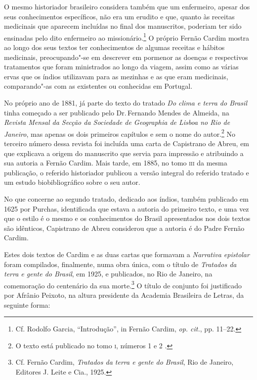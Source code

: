 O mesmo historiador brasileiro considera também que um enfermeiro,
apesar dos seus conhecimentos específicos, não era um erudito e que,
quanto às receitas medicinais que aparecem incluídas no final dos
manuscritos, poderiam ter sido ensinadas pelo dito enfermeiro ao
missionário.\footnote{ Cf. Rodolfo Garcia, ``Introdução'', in
Fernão Cardim, \textit{op. cit.}, pp. 11--22.} O próprio Fernão Cardim
mostra ao longo dos seus textos ter conhecimentos de algumas receitas e
hábitos medicinais, preocupando"-se em descrever em pormenor as doenças
e respectivos tratamentos que foram ministrados ao longo da viagem,
assim como as várias ervas que os índios utilizavam para as mezinhas e
as que eram medicinais, comparando"-as com as existentes ou conhecidas em Portugal. 

No próprio ano de 1881, já parte do texto do tratado \textit{Do clima
e terra do Brasil} tinha começado a ser publicado pelo Dr.\,Fernando
Mendes de Almeida, na \textit{Revista Mensal da Secção da Sociedade de
Geographia de Lisboa no Rio de Janeiro}, mas apenas os dois primeiros
capítulos e sem o nome do autor.\footnote{ O texto está publicado no
tomo \textsc{i}, números 1 e 2 .} No terceiro número dessa revista foi
incluída uma carta de Capistrano de Abreu, em que explicava a origem do
manuscrito que servia para impressão e atribuindo a sua autoria a
Fernão Cardim. Mais tarde, em 1885, no tomo \textsc{iii} da mesma
publicação, o referido historiador publicou a versão integral
do referido tratado e um estudo biobibliográfico sobre o seu autor. 

No que concerne ao segundo tratado, dedicado aos índios,
também publicado em 1625 por Purchas, identificada que estava a
autoria do primeiro texto, e uma vez que o estilo é o mesmo e os
conhecimentos do Brasil apresentados nos dois textos são idênticos,
Capistrano de Abreu considerou que a autoria é do Padre Fernão Cardim.

Estes dois textos de Cardim e as duas cartas que formavam a
\textit{Narrativa epistolar} foram compilados, finalmente, numa obra
única, com o título de \textit{Tratados da terra e gente do Brasil}, em
1925, e publicados, no Rio de Janeiro, na comemoração do centenário da
sua morte.\footnote{ Cf. Fernão Cardim, \textit{Tratados da terra
e gente do Brasil}, Rio de Janeiro, Editores J. Leite e Cia., 1925.} O
título de conjunto foi justificado por Afrânio Peixoto, na altura
presidente da Academia Brasileira de Letras, da seguinte forma:

